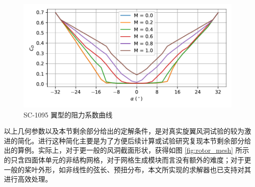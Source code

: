 \begin{figure}[h!]
\begin{centering}
\includegraphics[width=1\textwidth,height=0.26\textheight,keepaspectratio]{figures/airfoil/drag}
\par\end{centering}
\caption{\label{fig:rotor_c_drag}SC-1095 翼型的阻力系数曲线}
\end{figure}

以上几何参数以及本节剩余部分给出的定解条件，是对真实旋翼风洞试验的较为激进的简化。进行这种简化主要是为了方便后续计算或试验研究复现本节剩余部分给出的算例。实际上，对于更一般的风洞截面形状，获得如图
\ref{fig:rotor_mesh} 所示的只含四面体单元的非结构网格，对于网格生成模块而言没有额外的难度；对于更一般的桨叶外形，如非线性的弦长、预扭分布，本文所实现的求解器也已支持对其进行高效处理。

\newpage{}

